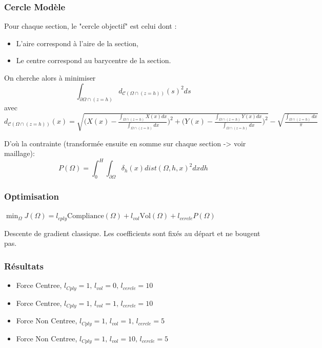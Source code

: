 \documentclass{beamer}
\begin{document}
	\begin{frame}
		\frametitle{Cercle Modèle}
		Pour chaque section, le "cercle objectif" est celui dont :
		
		\begin{itemize}
			\item L'aire correspond à l'aire de la section,
			\item Le centre correspond au barycentre de la section.
		\end{itemize}
		
		On cherche alors à minimiser 
		\begin{equation}
		\label{eq:defC1}
		\int_{\partial\Omega\cap (z=h)}d_{\mathcal{C}(\Omega\cap (z=h))}(s)^2ds
		\end{equation}
		avec 
		$
		\label{eq:explicitdist}
		d_{\mathcal{C}(\Omega\cap (z=h))}(x)=\sqrt{\Bigg(X(x)-\frac{\int_{\Omega\cap (z=h)}X(x)dx}{\int_{\Omega\cap (z=h)}dx}\Bigg)^2+\Bigg(Y(x)-\frac{\int_{\Omega\cap (z=h)}Y(x)dx}{\int_{\Omega\cap (z=h)}dx}\Bigg)^2}-\sqrt{\frac{\int_{\Omega\cap (z=h)}dx}{\pi}}
		$
		
		D'où la contrainte (transformée ensuite en somme sur chaque section -> voir maillage):
		\begin{equation}
		\label{eq:constraint2}
		P(\Omega)=\int_{0}^{H}\int_{\partial\Omega}\delta_h(x)dist(\Omega,h,x)^2dxdh
		\end{equation}
	\end{frame}
	
	
	\begin{frame}
		\frametitle{Optimisation}
		
		$\min_{\Omega} J(\Omega)=l_{cply}\textrm{Compliance}(\Omega)+l_{vol}\textrm{Vol}(\Omega)+l_{cercle}P(\Omega)$
		
		\vspace{2cm}
		
		Descente de gradient classique. Les coefficients sont fixés au départ et ne bougent pas.
		
	\end{frame}
	
	\begin{frame}
		\frametitle{Résultats}
		\begin{itemize}
			\item Force Centree, $l_{Cply}=1,\,l_{vol}=0,\,l_{cercle}=10$
			\item Force Centree, $l_{Cply}=1,\,l_{vol}=1,\,l_{cercle}=10$
			\item Force Non Centree, $l_{Cply}=1,\,l_{vol}=1,\,l_{cercle}=5$
			\item Force Non Centree, $l_{Cply}=1,\,l_{vol}=10,\,l_{cercle}=5$
		\end{itemize}
	\end{frame}
	
\end{document}

